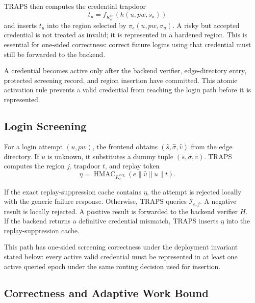 TRAPS then computes the credential trapdoor
\[
t_u=f_{K_e^{\mathrm{td}}}(h(u,pw,s_u))
\]
and inserts \(t_u\) into the region selected by \(\pi_e(u,pw,\sigma_u)\). A risky but accepted credential is not treated as invalid; it is represented in a hardened region. This is essential for one-sided correctness: correct future logins using that credential must still be forwarded to the backend.

A credential becomes active only after the backend verifier, edge-directory entry, protected screening record, and region insertion have committed. This atomic activation rule prevents a valid credential from reaching the login path before it is represented.

\subsection{Login Screening}

For a login attempt \((u,pw)\), the frontend obtains \((\hat{s},\hat{\sigma},\hat v)\) from the edge directory. If \(u\) is unknown, it substitutes a dummy tuple \((\bar{s},\bar{\sigma},\bar v)\). TRAPS computes the region \(j\), trapdoor \(t\), and replay token
\[
\eta
=
\operatorname{HMAC}_{K_e^{\mathrm{neg}}}
\left(
e \parallel \hat v \parallel u \parallel t
\right).
\]

If the exact replay-suppression cache contains \(\eta\), the attempt is rejected locally with the generic failure response. Otherwise, TRAPS queries \(\mathcal I_{e,j}\). A negative result is locally rejected. A positive result is forwarded to the backend verifier \(H\). If the backend returns a definitive credential mismatch, TRAPS inserts \(\eta\) into the replay-suppression cache.

This path has one-sided screening correctness under the deployment invariant stated below: every active valid credential must be represented in at least one active queried epoch under the same routing decision used for insertion.

\subsection{Correctness and Adaptive Work Bound}
\label{sec:correctness-bound}

